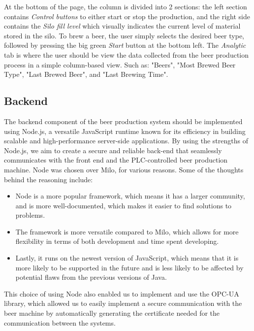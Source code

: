At the bottom of the page, the column is divided into 2 sections: the left section contains \textit{Control buttons} to either start or stop the production, and the right side contains the \textit{Silo fill level} which visually indicates the current level of material stored in the silo. \newline
To brew a beer, the user simply selects the desired beer type, followed by pressing the big green \textit{Start} button at the bottom left.
The \textit{Analytic} tab is where the user should be view the data collected from the beer production process in a simple column-based view. Such as: "Beers", "Most Brewed Beer Type", "Last Brewed Beer", and "Last Brewing Time". \newline

\subsection{Backend}
The backend component of the beer production system should be implemented using Node.js, a versatile JavaScript runtime known for its efficiency in building scalable and high-performance server-side applications. By using the strengths of Node.js, we aim to create a secure and reliable back-end that seamlessly communicates with the front end and the PLC-controlled beer production machine.
Node was chosen over Milo, for various reasons. Some of the thoughts behind the reasoning include:
\begin{itemize}
  \item Node is a more popular framework, which means it has a larger community, and is more well-documented, which makes it easier to find solutions to problems.  
  \item The framework is more versatile compared to Milo, which allows for more flexibility in terms of both development and time spent developing. 
  \item Lastly, it runs on the newest version of JavaScript, which means that it is more likely to be supported in the future and is less likely to be affected by potential flaws from the previous versions of Java. \newline
\end{itemize}
This choice of using Node also enabled us to implement and use the OPC-UA library, which allowed us to easily implement a secure communication with the beer machine by automatically generating the certificate needed for the communication between the systems.

